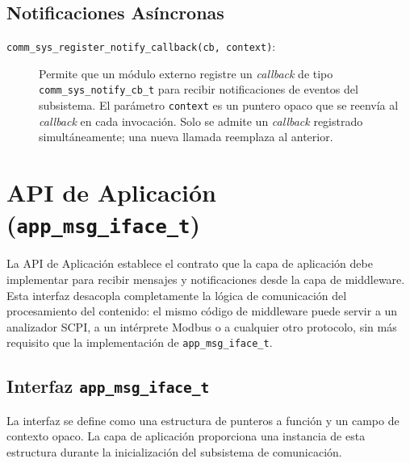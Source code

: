 \subsection{Notificaciones Asíncronas}
\label{subsec:sys-notificaciones}

\begin{description}
    \item[\texttt{comm\_sys\_register\_notify\_callback(cb, context)}:] Permite que un módulo externo registre un \textit{callback} de tipo \texttt{comm\_sys\_notify\_cb\_t} para recibir notificaciones de eventos del subsistema. El parámetro \texttt{context} es un puntero opaco que se reenvía al \textit{callback} en cada invocación. Solo se admite un \textit{callback} registrado simultáneamente; una nueva llamada reemplaza al anterior.
\end{description}

\section{API de Aplicación (\texttt{app\_msg\_iface\_t})}
\label{sec:api-aplicacion}

La API de Aplicación establece el contrato que la capa de aplicación debe implementar para recibir mensajes y notificaciones desde la capa de middleware. Esta interfaz desacopla completamente la lógica de comunicación del procesamiento del contenido: el mismo código de middleware puede servir a un analizador SCPI, a un intérprete Modbus o a cualquier otro protocolo, sin más requisito que la implementación de \texttt{app\_msg\_iface\_t}.

\subsection{Interfaz \texttt{app\_msg\_iface\_t}}
\label{subsec:app-iface-estructura}

La interfaz se define como una estructura de punteros a función y un campo de contexto opaco. La capa de aplicación proporciona una instancia de esta estructura durante la inicialización del subsistema de comunicación.


